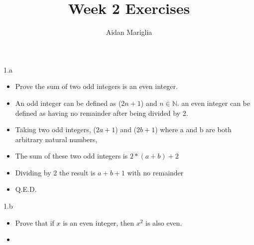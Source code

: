\documentclass[12pt]{article}
\title{Week 2 Exercises}
\author{Aidan Mariglia}
\begin{document}
{\large 1.a \par}

\begin{itemize}

\item Prove the sum of two odd integers is an even integer. 
\item An odd integer can be defined as ($2n + 1$) and
$n \in \mathbb{N}$.
an even integer can be defined as having no remainder after being divided by 2. 


\item Taking two odd integers, ($2a + 1$) and ($2b + 1$) where a and b are 
both arbitrary natural numbers,

\item The sum of these two odd integers is $2 * (a + b) + 2$

\item Dividing by 2 the result is $a + b + 1$ with no remainder
\item Q.E.D.

\end{itemize}

{\large 1.b \par}

\begin{itemize}

\item Prove that if $x$ is an even integer, then $x^2$ is also even.

\item 


\end{itemize}
\end{document}
